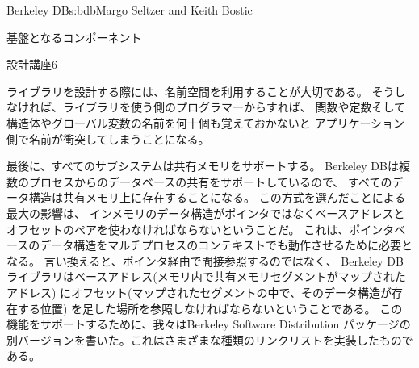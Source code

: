 \begin{aosachapter}{Berkeley DB}{s:bdb}{Margo Seltzer and Keith Bostic}
\begin{aosasect1}{基盤となるコンポーネント}
\begin{aosabox}{設計講座6}

ライブラリを設計する際には、名前空間を利用することが大切である。
そうしなければ、ライブラリを使う側のプログラマーからすれば、
関数や定数そして構造体やグローバル変数の名前を何十個も覚えておかないと
アプリケーション側で名前が衝突してしまうことになる。

\end{aosabox}

最後に、すべてのサブシステムは共有メモリをサポートする。
Berkeley DBは複数のプロセスからのデータベースの共有をサポートしているので、
すべてのデータ構造は共有メモリ上に存在することになる。
この方式を選んだことによる最大の影響は、
インメモリのデータ構造がポインタではなくベースアドレスとオフセットのペアを使わなければならないということだ。
これは、ポインタベースのデータ構造をマルチプロセスのコンテキストでも動作させるために必要となる。
言い換えると、ポインタ経由で間接参照するのではなく、
Berkeley DBライブラリはベースアドレス(メモリ内で共有メモリセグメントがマップされたアドレス)
にオフセット(マップされたセグメントの中で、そのデータ構造が存在する位置)
を足した場所を参照しなければならないということである。
この機能をサポートするために、我々はBerkeley Software Distribution 
パッケージの別バージョンを書いた。これはさまざまな種類のリンクリストを実装したものである。


\end{aosasect1}
\end{aosachapter}
